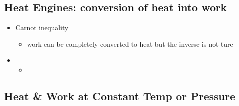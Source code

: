 \subsection*{Heat Engines: conversion of heat into work}
\begin{itemize}
    \item Carnot inequality
    \begin{itemize}
        \item work can be completely converted to heat but the inverse is not ture 
    \end{itemize}
    \item 
    \begin{itemize}
        \item 
    \end{itemize}
\end{itemize}

\subsection*{Heat \& Work at Constant Temp or Pressure }